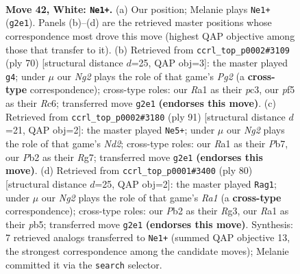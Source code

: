 \documentclass[11pt]{article}
\begin{document}
\clearpage

\begin{figure}[p]\centering
\begin{subfigure}{0.46\textwidth}\centering
\resizebox{\linewidth}{!}{%
\newchessgame
\chessboard[
  setfen={8/pR6/8/2p2p1P/4p3/3k4/1P4N1/R2K3r w - - 1 42},
  showmover=false,
  pgfstyle=straightmove, color=movearrow, markmove={g2-e1}
]}
\caption{}
\end{subfigure}\hfill
\begin{subfigure}{0.46\textwidth}\centering
\resizebox{\linewidth}{!}{%
\newchessgame
\chessboard[
  setfen={8/8/P1R3p1/4p3/3k3P/2p5/r4PP1/4K3 w - - 0 36},
  showmover=false,
  pgfstyle=straightmove, color=movearrow, markmove={g2-g4}
]}
\caption{}
\end{subfigure}
\\[4pt]
\begin{subfigure}{0.46\textwidth}\centering
\resizebox{\linewidth}{!}{%
\newchessgame
\chessboard[
  setfen={8/1p1n2r1/5pP1/p1Pk3P/R7/5K2/4P3/8 b - - 4 46},
  showmover=false,
  pgfstyle=straightmove, color=movearrow, markmove={d7-e5}
]}
\caption{}
\end{subfigure}\hfill
\begin{subfigure}{0.46\textwidth}\centering
\resizebox{\linewidth}{!}{%
\newchessgame
\chessboard[
  setfen={8/p7/2p3pk/1p1n4/7P/P2K2R1/7r/R7 w - - 2 41},
  showmover=false,
  pgfstyle=straightmove, color=movearrow, markmove={a1-g1}
]}
\caption{}
\end{subfigure}
\caption{\textbf{Move 42, White: \texttt{Ne1+}.} (a) Our position; Melanie plays \texttt{Ne1+} (\texttt{g2e1}). Panels (b)--(d) are the retrieved master positions whose correspondence most drove this move (highest QAP objective among those that transfer to it). (b) Retrieved from \texttt{ccrl\_top\_p0002\#3109} (ply 70) [structural distance $d$=25, QAP obj=3]: the master played \texttt{g4}; under $\mu$ our \emph{Ng2} plays the role of that game's \emph{Pg2} (a \textbf{cross-type} correspondence); cross-type roles: our \emph{R}a1 as their \emph{p}c3, our \emph{p}f5 as their \emph{R}c6; transferred move \texttt{g2e1} \textbf{(endorses this move)}. (c) Retrieved from \texttt{ccrl\_top\_p0002\#3180} (ply 91) [structural distance $d$=21, QAP obj=2]: the master played \texttt{Ne5+}; under $\mu$ our \emph{Ng2} plays the role of that game's \emph{Nd2}; cross-type roles: our \emph{R}a1 as their \emph{P}b7, our \emph{P}b2 as their \emph{R}g7; transferred move \texttt{g2e1} \textbf{(endorses this move)}. (d) Retrieved from \texttt{ccrl\_top\_p0001\#3400} (ply 80) [structural distance $d$=25, QAP obj=2]: the master played \texttt{Rag1}; under $\mu$ our \emph{Ng2} plays the role of that game's \emph{Ra1} (a \textbf{cross-type} correspondence); cross-type roles: our \emph{P}b2 as their \emph{R}g3, our \emph{R}a1 as their \emph{p}b5; transferred move \texttt{g2e1} \textbf{(endorses this move)}. Synthesis: 7 retrieved analogs transferred to \texttt{Ne1+} (summed QAP objective 13, the strongest correspondence among the candidate moves); Melanie committed it via the \texttt{search} selector.}
\label{fig:thought-m82}
\end{figure}
\end{document}
